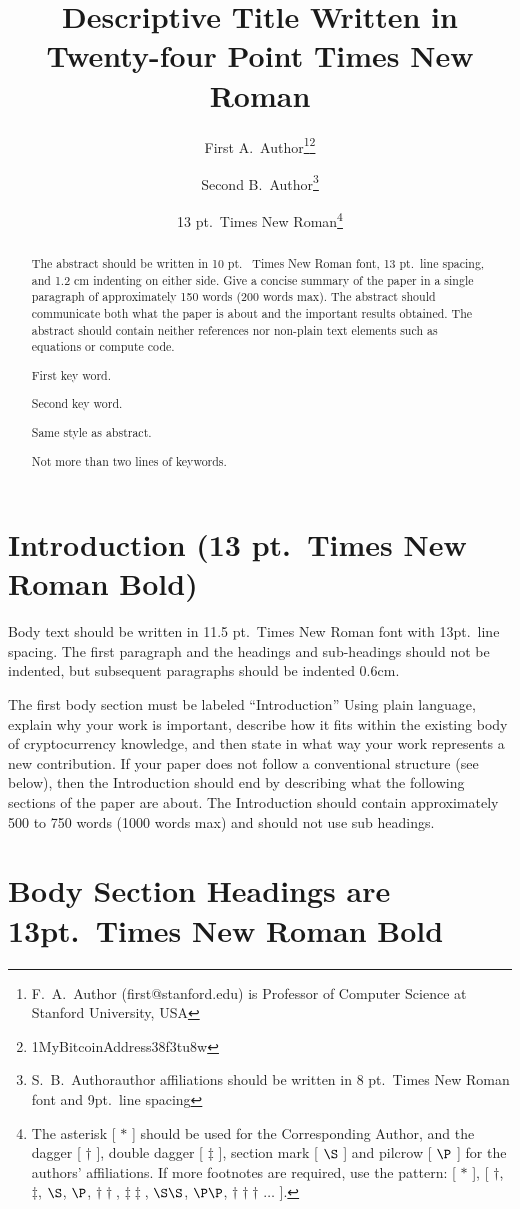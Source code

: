 \documentclass{ledger}
\title{Descriptive Title Written in Twenty-four Point Times New Roman}
\author{First A.~Author\thanks{F.~A.~Author (first@stanford.edu) is Professor of Computer Science at Stanford University, USA}\thanks{1MyBitcoinAddress38f3tu8w}\and Second B.~Author\thanks{S.~B.~Author\textellipsis author affiliations should be written in 8 pt.~Times New Roman font and 9pt.~line spacing}\and 13 pt.~Times New Roman\thanks{The asterisk [ $\ast$ ] should be used for the Corresponding Author, and the dagger [ $\dagger$ ], double dagger [ $\ddagger$ ], section mark [ $\S$ ] and pilcrow [ $\P$ ] for the authors’ affiliations. If more footnotes are required, use the pattern: [ $\ast$ ], [ $\dagger$, $\ddagger$, $\S$, $\P$, $\dagger\dagger$, $\ddagger\ddagger$, $\S\S$, $\P\P$, $\dagger\dagger\dagger$ $\dots$ ].}}
\begin{document}
\maketitle

\thispagestyle{pagefirst}

\begin{abstract}
The abstract should be written in 10 pt.~ Times New Roman font, 13 pt.~line spacing, and 1.2 cm indenting on either side.  Give a concise summary of the paper in a single paragraph of approximately 150 words (200 words max).  The abstract should communicate both what the paper is about and the important results obtained.  The abstract should contain neither references nor non-plain text elements such as equations or compute code.

\begin{keywords}
\item First key word.
\item Second key word.
\item Same style as abstract.
\item Not more than two lines of keywords.
\end{keywords}
\end{abstract}

\section{Introduction (13 pt.\ Times New Roman Bold)}

Body text should be written in 11.5 pt.\ Times New Roman font with 13pt.\ line spacing.  The first paragraph and the headings and sub-headings should not be indented, but subsequent paragraphs should be indented 0.6cm.

The first body section must be labeled ``Introduction''  Using plain language, explain why your work is important, describe how it fits within the existing body of cryptocurrency knowledge, and then state in what way your work represents a new contribution.  If your paper does not follow a conventional structure (see below), then the Introduction should end by describing what the following sections of the paper are about.  The Introduction should contain approximately 500 to 750 words (1000 words max) and should not use sub headings.

\section{Body Section Headings are 13pt.\ Times New Roman Bold}
\end{document}
